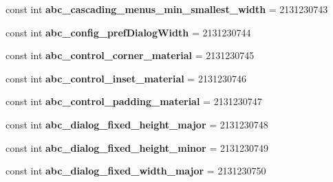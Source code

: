 \begin{DoxyCompactItemize}
\item 
\mbox{\label{classst_delivery_1_1_resource_1_1_dimension_aa47eeaec5ea26570948e5f7a7ca5d413}} 
const int {\bfseries abc\+\_\+cascading\+\_\+menus\+\_\+min\+\_\+smallest\+\_\+width} = 2131230743
\item 
\mbox{\label{classst_delivery_1_1_resource_1_1_dimension_a767488ff20c47dbca30a373530bc36b8}} 
const int {\bfseries abc\+\_\+config\+\_\+pref\+Dialog\+Width} = 2131230744
\item 
\mbox{\label{classst_delivery_1_1_resource_1_1_dimension_a13ea2549af0041cc533bef6bf1aa9588}} 
const int {\bfseries abc\+\_\+control\+\_\+corner\+\_\+material} = 2131230745
\item 
\mbox{\label{classst_delivery_1_1_resource_1_1_dimension_af80bca83c35760a1b891e62ad1aa33d2}} 
const int {\bfseries abc\+\_\+control\+\_\+inset\+\_\+material} = 2131230746
\item 
\mbox{\label{classst_delivery_1_1_resource_1_1_dimension_a70d34f6e456d2c65853ea2aad96ff482}} 
const int {\bfseries abc\+\_\+control\+\_\+padding\+\_\+material} = 2131230747
\item 
\mbox{\label{classst_delivery_1_1_resource_1_1_dimension_a4e6c23be2a7bdbfdd326cdf032ef6822}} 
const int {\bfseries abc\+\_\+dialog\+\_\+fixed\+\_\+height\+\_\+major} = 2131230748
\item 
\mbox{\label{classst_delivery_1_1_resource_1_1_dimension_af462a21a6a4ff3a16f4a79a41c9c2769}} 
const int {\bfseries abc\+\_\+dialog\+\_\+fixed\+\_\+height\+\_\+minor} = 2131230749
\item 
\mbox{\label{classst_delivery_1_1_resource_1_1_dimension_a05cff5073b6aa80013305483efa00fd9}} 
const int {\bfseries abc\+\_\+dialog\+\_\+fixed\+\_\+width\+\_\+major} = 2131230750
\item 
\mbox{\label{classst_delivery_1_1_resource_1_1_dimension_a907f4ec485c07b60f216b71761379132}} 

\end{DoxyCompactItemize}
